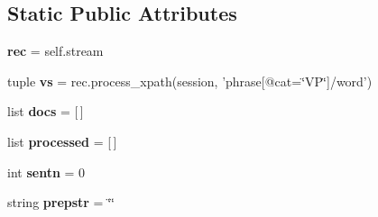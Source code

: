 \subsection*{Static Public Attributes}
\begin{DoxyCompactItemize}
\item 
\hypertarget{classcheshire3_1_1textmining_1_1document_factory_1_1_enju_record_document_stream_a9028eaeaa0cb28ee46461a4028da482b}{{\bfseries rec} = self.\-stream}\label{classcheshire3_1_1textmining_1_1document_factory_1_1_enju_record_document_stream_a9028eaeaa0cb28ee46461a4028da482b}

\item 
\hypertarget{classcheshire3_1_1textmining_1_1document_factory_1_1_enju_record_document_stream_a76c2edd3c5cc1844226d7d6a1aef69fe}{tuple {\bfseries vs} = rec.\-process\-\_\-xpath(session, 'phrase\mbox{[}@cat=\char`\"{}V\-P\char`\"{}\mbox{]}/word')}\label{classcheshire3_1_1textmining_1_1document_factory_1_1_enju_record_document_stream_a76c2edd3c5cc1844226d7d6a1aef69fe}

\item 
\hypertarget{classcheshire3_1_1textmining_1_1document_factory_1_1_enju_record_document_stream_a04360294d529b520512db654ce07a763}{list {\bfseries docs} = \mbox{[}$\,$\mbox{]}}\label{classcheshire3_1_1textmining_1_1document_factory_1_1_enju_record_document_stream_a04360294d529b520512db654ce07a763}

\item 
\hypertarget{classcheshire3_1_1textmining_1_1document_factory_1_1_enju_record_document_stream_abf20f179847f22ad1149edbe52dfde3d}{list {\bfseries processed} = \mbox{[}$\,$\mbox{]}}\label{classcheshire3_1_1textmining_1_1document_factory_1_1_enju_record_document_stream_abf20f179847f22ad1149edbe52dfde3d}

\item 
\hypertarget{classcheshire3_1_1textmining_1_1document_factory_1_1_enju_record_document_stream_a51fba51c76f93dba5a1c686853f3ef6e}{int {\bfseries sentn} = 0}\label{classcheshire3_1_1textmining_1_1document_factory_1_1_enju_record_document_stream_a51fba51c76f93dba5a1c686853f3ef6e}

\item 
\hypertarget{classcheshire3_1_1textmining_1_1document_factory_1_1_enju_record_document_stream_ac064072c1224fec388e74bf0dfd418ca}{string {\bfseries prepstr} = \char`\"{}\char`\"{}}\label{classcheshire3_1_1textmining_1_1document_factory_1_1_enju_record_document_stream_ac064072c1224fec388e74bf0dfd418ca}


\end{DoxyCompactItemize}
